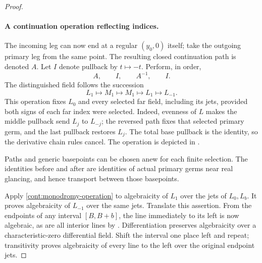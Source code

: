 \begin{proof}
\paragraph{A continuation operation reflecting indices.}
The incoming leg can now end at a regular \((y_0,0)\)
itself; take the outgoing primary leg from the same point.
The resulting closed continuation path is denoted \(A\).
Let \(I\) denote pullback by \(t\mapsto-t\).  Perform,
in order,
\begin{equation}
 A,\qquad I,\qquad A^{-1},\qquad I.
 \label{cont:monodromy-operation}
\end{equation}
The distinguished field follows the succession
\[
 L_1\longmapsto M_1\longmapsto M_1
     \longmapsto L_1\longmapsto L_{-1}.
\]
This operation fixes \(L_0\) and every selected far field,
including its jets, provided both signs of each far index
were selected.  Indeed, evenness of \(L\) makes the middle
pullback send \(L_j\) to \(L_{-j}\); the reversed path
fixes that selected primary germ, and the last pullback
restores \(L_j\).  The total base pullback is the identity,
so the derivative chain rules cancel.  The operation is
depicted in .



Paths and generic basepoints can be chosen anew for each
finite selection.  The identities before and after are
identities of actual primary germs near real glancing,
and hence transport between those basepoints.

Apply \eqref{cont:monodromy-operation} to algebraicity of
\(L_1\) over the jets of \(L_0,L_b\).  It proves algebraicity
of \(L_{-1}\) over the same jets.  Translate this assertion.
From the endpoints of any interval \([B,B+b]\), the line
immediately to its left is now algebraic, as are all
interior lines by .  Differentiation
preserves algebraicity over a characteristic-zero
differential field.  Shift the interval one place left
and repeat; transitivity proves algebraicity of every
line to the left over the original endpoint jets.


\end{proof}
